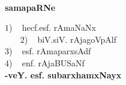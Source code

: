 

~
\medskip

\vfill

\thispagestyle{empty}

\begin{center}
{\Large\bfseries samapaRNe}
\end{center}
\bigskip

\begin{center}
$1$) ~ hecf.esf. rAmaNaNx\\[0.2cm]
~~~ $2$) ~ biV.siV. rAjagoVpAlf\\[0.2cm]
$3$) ~ esf. rAmaparxsAdf\\[0.2cm]
$4$) ~ enf. rAjaBUSaNf\\[0.2cm]
\hfill{\bf -veY. esf. subarxhamxNayx}                                                 
\end{center}

\vfill
\eject


